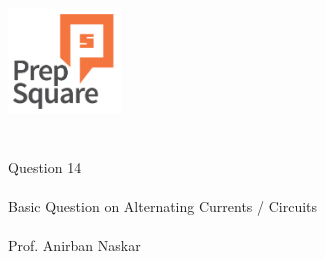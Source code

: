 \documentclass{beamer}
\begin{document}
\begin{center}
\ \\ \ \\
\includegraphics[width=30mm]{Logo-final.png} \\
\ \\ \ \\ 
{\huge Question 14 \\ \ \\ }
{\Large
Basic Question on Alternating Currents / Circuits
}
{\large \ \\ \ \\ Prof. Anirban Naskar }
\end{center}
\end{document}
